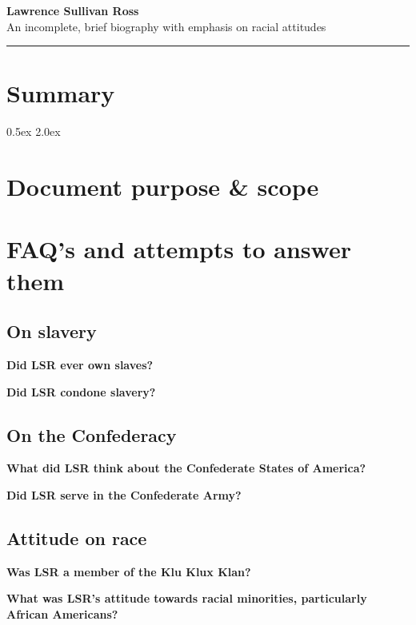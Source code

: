 \documentclass[12pt]{article}
\begin{document}
\Large{\textbf{Lawrence Sullivan Ross \\}}
\large{An incomplete, brief biography with emphasis on racial attitudes \\}
\rule{\textwidth}{1pt}

\section{Summary}

\parskip 0.5ex
\newpage
\tableofcontents
\parskip 2.0ex

\newpage
\section{Document purpose \& scope}

\newpage
\section{FAQ's and attempts to answer them}

\subsection{On slavery}
\textbf{Did LSR ever own slaves? \\ }

\textbf{Did LSR condone slavery? \\ }

\subsection{On the Confederacy}
\textbf{What did LSR think about the Confederate States of America? \\}

\textbf{Did LSR serve in the Confederate Army? \\ }

\subsection{Attitude on race}
\textbf{Was LSR a member of the Klu Klux Klan? \\ }

\textbf{What was LSR's attitude towards racial minorities, particularly African Americans? \\ }
\end{document}
